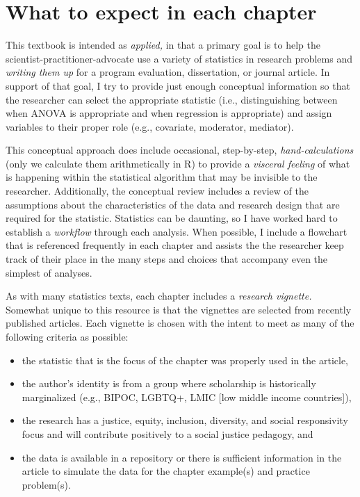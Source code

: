 \documentclass[
  english,
]{book}
\providecommand{\tightlist}{%
  \setlength{\itemsep}{0pt}\setlength{\parskip}{0pt}}
\begin{document}
\hypertarget{what-to-expect-in-each-chapter}{%
\section{What to expect in each chapter}\label{what-to-expect-in-each-chapter}}

This textbook is intended as \emph{applied,} in that a primary goal is to help the scientist-practitioner-advocate use a variety of statistics in research problems and \emph{writing them up} for a program evaluation, dissertation, or journal article. In support of that goal, I try to provide just enough conceptual information so that the researcher can select the appropriate statistic (i.e., distinguishing between when ANOVA is appropriate and when regression is appropriate) and assign variables to their proper role (e.g., covariate, moderator, mediator).

This conceptual approach does include occasional, step-by-step, \emph{hand-calculations} (only we calculate them arithmetically in R) to provide a \emph{visceral feeling} of what is happening within the statistical algorithm that may be invisible to the researcher. Additionally, the conceptual review includes a review of the assumptions about the characteristics of the data and research design that are required for the statistic. Statistics can be daunting, so I have worked hard to establish a \emph{workflow} through each analysis. When possible, I include a flowchart that is referenced frequently in each chapter and assists the the researcher keep track of their place in the many steps and choices that accompany even the simplest of analyses.

As with many statistics texts, each chapter includes a \emph{research vignette.} Somewhat unique to this resource is that the vignettes are selected from recently published articles. Each vignette is chosen with the intent to meet as many of the following criteria as possible:

\begin{itemize}
\tightlist
\item
  the statistic that is the focus of the chapter was properly used in the article,
\item
  the author's identity is from a group where scholarship is historically marginalized (e.g., BIPOC, LGBTQ+, LMIC {[}low middle income countries{]}),
\item
  the research has a justice, equity, inclusion, diversity, and social responsivity focus and will contribute positively to a social justice pedagogy, and
\item
  the data is available in a repository or there is sufficient information in the article to simulate the data for the chapter example(s) and practice problem(s).
\end{itemize}
\end{document}
